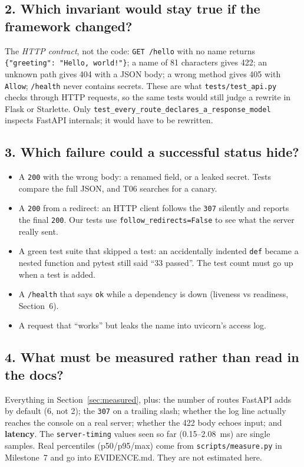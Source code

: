 \documentclass[11pt,a4paper]{article}
\newcommand{\code}[1]{\texttt{#1}}
\begin{document}
\subsection*{2. Which invariant would stay true if the framework changed?}
The \emph{HTTP contract}, not the code: \code{GET /hello} with no name returns
\code{\{"greeting": "Hello, world!"\}}; a name of 81 characters gives 422; an
unknown path gives 404 with a JSON body; a wrong method gives 405 with
\code{Allow}; \code{/health} never contains secrets. These are what
\code{tests/test\_api.py} checks through HTTP requests, so the same tests
would still judge a rewrite in Flask or Starlette. Only
\code{test\_every\_route\_declares\_a\_response\_model} inspects FastAPI
internals; it would have to be rewritten.

\subsection*{3. Which failure could a successful status hide?}
\begin{itemize}
  \item A \code{200} with the wrong body: a renamed field, or a leaked secret.
        Tests compare the full JSON, and T06 searches for a canary.
  \item A \code{200} from a redirect: an HTTP client follows the \code{307}
        silently and reports the final \code{200}. Our tests use
        \code{follow\_redirects=False} to see what the server really sent.
  \item A green test suite that skipped a test: an accidentally indented
        \code{def} became a nested function and pytest still said
        ``33 passed''. The test count must go up when a test is added.
  \item A \code{/health} that says \code{ok} while a dependency is down
        (liveness vs readiness, Section~6).
  \item A request that ``works'' but leaks the name into uvicorn's access log.
\end{itemize}

\subsection*{4. What must be measured rather than read in the docs?}
Everything in Section~\ref{sec:measured}, plus: the number of routes FastAPI
adds by default (6, not 2); the \code{307} on a trailing slash; whether the
log line actually reaches the console on a real server; whether the 422 body
echoes input; and \textbf{latency}. The \code{server-timing} values seen so
far (0.15--2.08~ms) are single samples. Real percentiles (p50/p95/max) come
from \code{scripts/measure.py} in Milestone~7 and go into EVIDENCE.md.
They are not estimated here.
\end{document}
